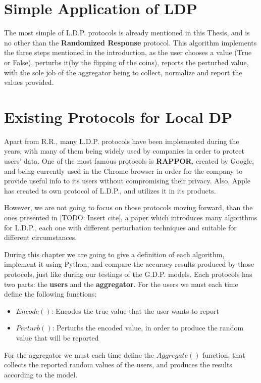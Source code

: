 \section{Simple Application of LDP}

The most simple of L.D.P. protocols is already mentioned in this Thesis, and is no other than the \textbf{Randomized Response} protocol. This algorithm implements the three steps mentioned in the introduction, as the user chooses a value (True or False), perturbs it(by the flipping of the coins), reports the perturbed value, with the sole job of the aggregator being to collect, normalize and report the values provided.


\section{Existing Protocols for Local DP}

Apart from R.R., many L.D.P. protocols have been implemented during the years, with many of them being widely used by companies in order to protect users' data. One of the most famous protocols is \textbf{RAPPOR}, created by Google, and being currently used in the Chrome browser in order for the company to provide useful info to its users without compromising their privacy. Also, Apple has created ts own protocol of L.D.P., and utilizes it in its products. 

However, we are not going to focus on those protocols moving forward, than the ones presented in [TODO: Insert cite], a paper which introduces many algorithms for L.D.P., each one with different perturbation techniques and suitable for different circumstances.

During this chapter we are going to give a definition of each algorithm, implement it using Python, and compare the accuracy results produced by those protocols, just like during our testings of the G.D.P. models. Each protocols has two parts: the \textbf{users} and the \textbf{aggregator}. For the users we must each time define the following functions:

\begin{itemize}
    \item $Encode()$: Encodes the true value that the user wants to report
    \item $Perturb()$: Perturbs the encoded value, in order to produce the random value that will be reported
\end{itemize}

For the aggregator we must each time define the  $Aggregate()$ function, that collects the reported random values of the users, and produces the results according to the model.

